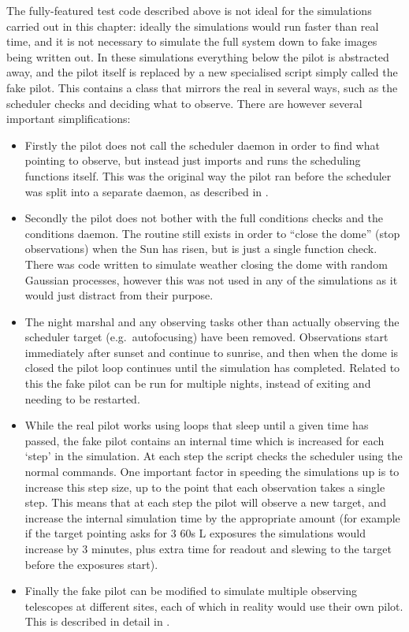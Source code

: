\begin{colsection}
\begin{colsection}
The fully-featured test code described above is not ideal for the simulations carried out in this chapter: ideally the simulations would run faster than real time, and it is not necessary to simulate the full system down to fake images being written out. In these simulations everything below the pilot is abstracted away, and the pilot itself is replaced by a new specialised script simply called the fake pilot. This contains a class  that mirrors the real  in several ways, such as the scheduler checks and deciding what to observe. There are however several important simplifications:

\begin{itemize}
    \item Firstly the pilot does not call the scheduler daemon in order to find what pointing to observe, but instead just imports and runs the scheduling functions itself. This was the original way the pilot ran before the scheduler was split into a separate daemon, as described in .
    \item Secondly the pilot does not bother with the full conditions checks and the conditions daemon. The  routine still exists in order to ``close the dome'' (stop observations) when the Sun has risen, but is just a single function check. There was code written to simulate weather closing the dome with random Gaussian processes, however this was not used in any of the simulations as it would just distract from their purpose.
    \item The night marshal and any observing tasks other than actually observing the scheduler target (e.g.\ autofocusing) have been removed. Observations start immediately after sunset and continue to sunrise, and then when the dome is closed the pilot loop continues until the simulation has completed. Related to this the fake pilot can be run for multiple nights, instead of exiting and needing to be restarted.
    \item While the real pilot works using loops that sleep until a given time has passed, the fake pilot contains an internal time which is increased for each `step' in the simulation. At each step the script checks the scheduler using the normal commands. One important factor in speeding the simulations up is to increase this step size, up to the point that each observation takes a single step. This means that at each step the pilot will observe a new target, and increase the internal simulation time by the appropriate amount (for example if the target pointing asks for 3 60s L exposures the simulations would increase by 3 minutes, plus extra time for readout and slewing to the target before the exposures start).
    \item Finally the fake pilot can be modified to simulate multiple observing telescopes at different sites, each of which in reality would use their own pilot. This is described in detail in .
\end{itemize}


\end{colsection}
\end{colsection}
